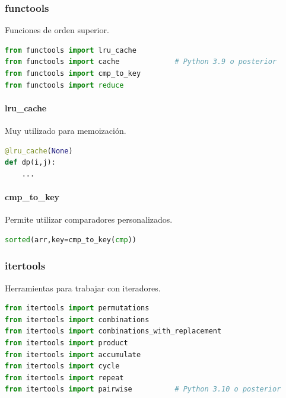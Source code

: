 \vspace{0.3cm}

\subsubsection{functools}

Funciones de orden superior.

\begin{lstlisting}[language=Python]
from functools import lru_cache
from functools import cache             # Python 3.9 o posterior
from functools import cmp_to_key
from functools import reduce
\end{lstlisting}

\paragraph{lru\_cache}

Muy utilizado para memoización.

\begin{lstlisting}[language=Python]
@lru_cache(None)
def dp(i,j):
    ...
\end{lstlisting}

\paragraph{cmp\_to\_key}

Permite utilizar comparadores personalizados.

\begin{lstlisting}[language=Python]
sorted(arr,key=cmp_to_key(cmp))
\end{lstlisting}

\vspace{0.3cm}

\subsubsection{itertools}

Herramientas para trabajar con iteradores.

\begin{lstlisting}[language=Python]
from itertools import permutations
from itertools import combinations
from itertools import combinations_with_replacement
from itertools import product
from itertools import accumulate
from itertools import cycle
from itertools import repeat
from itertools import pairwise          # Python 3.10 o posterior
\end{lstlisting}

